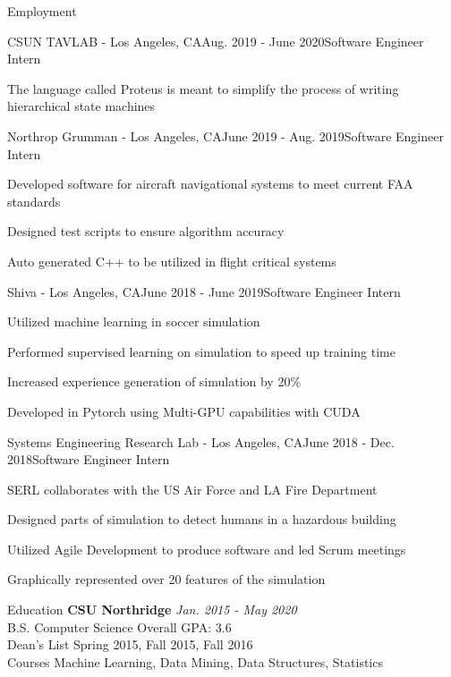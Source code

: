 \documentclass{resume}
\begin{document}
\begin{rSection}{Employment}
\begin{rSubsection}{CSUN TAVLAB - Los Angeles, CA}{Aug. 2019 - June 2020}{Software Engineer Intern}{}
        \item The language called Proteus is meant to simplify the process of writing hierarchical state machines
    \end{rSubsection}
    \begin{rSubsection}{Northrop Grumman - Los Angeles, CA}{June 2019 - Aug. 2019}{Software Engineer Intern}{}
        \item Developed software for aircraft navigational systems to meet current FAA standards
        \item Designed test scripts to ensure algorithm accuracy
        \item Auto generated C++ to be utilized in flight critical systems
    \end{rSubsection}
    \begin{rSubsection}{Shiva - Los Angeles, CA}{June 2018 - June 2019}{Software Engineer Intern}{}
        \item Utilized machine learning in soccer simulation
        \item Performed supervised learning on simulation to speed up training time
        \item Increased experience generation of simulation by 20\%
        \item Developed in Pytorch using Multi-GPU capabilities with CUDA
    \end{rSubsection}
    \begin{rSubsection}{Systems Engineering Research Lab - Los Angeles, CA}{June 2018 - Dec. 2018}{Software Engineer Intern}{}
        \item SERL collaborates with the US Air Force and LA Fire Department
        \item Designed parts of simulation to detect humans in a hazardous building
        \item Utilized Agile Development to produce software and led Scrum meetings
        \item Graphically represented over 20 features of the simulation
    \end{rSubsection}
\end{rSection}

\begin{rSection}{Education}
    {\bf CSU Northridge} \hfill {\em Jan. 2015 - May 2020} 
    \\ B.S. Computer Science \hfill { Overall GPA: 3.6 }
    \\ Dean's List \hfill {Spring 2015, Fall 2015, Fall 2016}
    \\ Courses \hfill {Machine Learning, Data Mining, Data Structures, Statistics}
\end{rSection}
\end{document}
